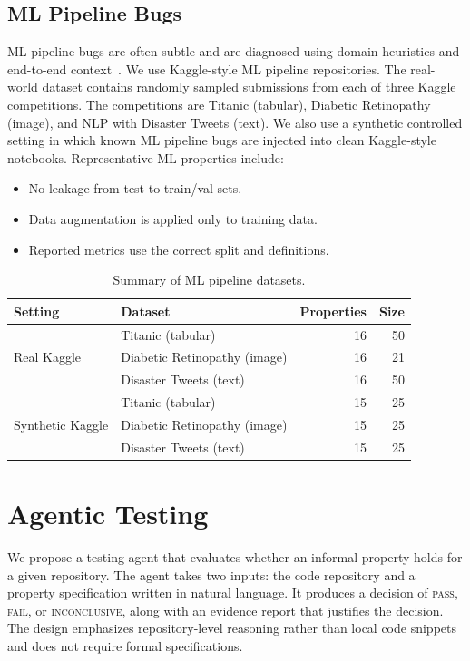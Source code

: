 \documentclass[11pt]{article}
\begin{document}
\subsection{ML Pipeline Bugs}
ML pipeline bugs are often subtle and are diagnosed using domain heuristics and end-to-end context~\citep{schoop2021umlaut}.
We use Kaggle-style ML pipeline repositories.
The real-world dataset contains randomly sampled submissions from each of three Kaggle competitions.
The competitions are Titanic (tabular), Diabetic Retinopathy (image), and NLP with Disaster Tweets (text).
We also use a synthetic controlled setting in which known ML pipeline bugs are injected into clean Kaggle-style notebooks.
Representative ML properties include:
\begin{itemize}
  \item No leakage from test to train/val sets.
  \item Data augmentation is applied only to training data.
  \item Reported metrics use the correct split and definitions.
\end{itemize}

\begin{table}[t]
  \centering
  \caption{Summary of ML pipeline datasets.}
  \label{tab:datasets}
  \begin{tabular}{llrr}
    \toprule
    Setting & Dataset & Properties & Size \\
    \midrule
    \multirow{3}{*}{Real Kaggle} & Titanic (tabular) & 16 & 50 \\
    & Diabetic Retinopathy (image) & 16 & 21 \\
    & Disaster Tweets (text) & 16 & 50 \\
    \midrule
    \multirow{3}{*}{Synthetic Kaggle} & Titanic (tabular) & 15 & 25 \\
    & Diabetic Retinopathy (image) & 15 & 25 \\
    & Disaster Tweets (text) & 15 & 25 \\
    \bottomrule
  \end{tabular}
\end{table}

\section{Agentic Testing}

We propose a testing agent that evaluates whether an informal property holds for a given repository.
The agent takes two inputs: the code repository and a property specification written in natural language.
It produces a decision of \textsc{pass}, \textsc{fail}, or \textsc{inconclusive}, along with an evidence report that justifies the decision.
The design emphasizes repository-level reasoning rather than local code snippets and does not require formal specifications.
\end{document}
